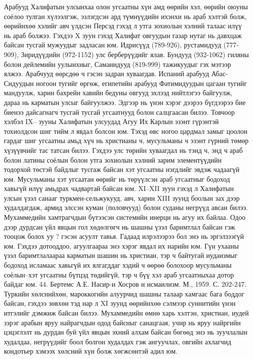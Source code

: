Арабууд Халифатын улсынхаа олон угсаатны хүн амд өөрийн хэл, өөрийн оюуны соёлоо тулган хүлээлгэж, эзлэгдсэн ард түмнүүдийн ихэнхи нь араб хэлтэй болж, өөрийнхөө хэлийг авч үлдсэн Персэд гэхэд л утга зохиолын хэлний талаас илүү нь араб болжээ.
Гэхдээ X зуун гэхэд Халифат овгуудын газар нутаг нь давхцаж байсан тусгай мужуудыг задласан юм. Идрисүүд (789-926), рустамидууд (777-909), Зиридүүдийн (972-1152) улс берберүүдийг ялав. Бундууд (932-1062) гиляны болон дейлемийн уулынхныг, Саманидууд (819-999) тажикуудыг гэх мэтээр ялжээ. Арабчууд өөрсдөө ч гэсэн задран хуваагдав. Испаний арабууд Абас-Сидуудын ногоон тугийг өргөж, египетийн арабууд Фатимидуудын цагаан тугийг мандуулж, харин бахрейн хавийн бедуны овгууд эхлээд нийтлэгээ байгуулж, дараа нь карматын улсыг байгуулжээ. Эдгээр нь үнэн хэрэг дээрээ бүгдээрээ бие биенээ дайсагнагч тусгай тусгай угсаатнууд болон салцгаасан билээ.
Товчоор хэлбэл IX– зууны Халифатын улсуудад Агуу Их Карлын эзэнт гүрэнтэй тохиолдсон шиг тийм л явдал болсон юм. Тэхэд өвс ногоо цардмал замыг цоолон гардаг шиг угсаатны амьд хүч нь христианы ч, мусульманы ч эзэнт гүрний төмөр хүзүүвчийг тас татсан билээ. Гэхдээ улс төрийн хуваагдал нь тэнд ч, энд ч араб болон латины соёлын болон утга зохиолын хэлний зарим элементүүдийн тодорхой төстэй байдлыг тусгаж байсан хэт угсаатны нэгдлийг эвдэж чадаагүй юм. Мусульманы хэт угсаатан өөрийг нь төрүүлсэн араб угсаатныг бодоход хавьгүй илүү амьдрах чадвартай байсан юм. XI–XII зуун гэхэд л Халифатын улсын үзэл санааг туркмен-сельжукууд, авч, харин XIII зуунд боолын зах дээр худалдагдаж, армид элссэн куман (половчууд) болон суданы негрүүд авсан билээ. Мухаммедийн хамтрагчдын бүтээсэн системийн инерци нь агуу их байлаа.
Одоо дээр дурдсан үйл явцын гол хөдөлгөгч нь шашны үзэл баримтлал байсан гэж тооцож болох уу ? гэсэн асуулт тавья. Гадаад илрэлээрээ бол энэ нь эргэлзээгүй юм. Гэхдээ дотооддоо, агуулгаараа энэ хэрэг явдал их нарийн юм. Гүн ухааны үзэл баримтлалаараа карматын шашин нь христиан, тэр ч байтугай иудаизмыг бодоход исламаас хавьгүй их ялгагддаг хэдий ч өөрөө болохоор мусульманы соёлын–хэт угсаатны бүтцэд төдийгүй, тэр ч бүү хэл араб угсаатныхаа дотор байдаг юм. 44. Бертемс А.Е. Насир-и Хосров и исмаилизм. М., 1959. С. 202-247.
Туркийн хөлснийхөн, мароккогийн алуурчид шашны талаар хамгаас бага боддог байсан, гэхдээ зөвхөн тэд нар л XI зуунд өөрийнхөө сэлмээр суннитийн үнэн итгэлийг дэмжиж байсан билээ. Мухаммедийн өмнө харь хэлтэн, христиан, иудей зэрэг арабын яруу найрагчдын одод байсныг санацгаая, учир нь яруу найргийн цэцэглэлт нь дурдан буй үйл явцын эхний алхам байсан бөгөөд энэ нь зуучлалын худалдаа, негрүүдийг боол болгон худалдах гэж ангуучлах, овгийн ахлагчид кондотьер хэмээх хөлсний хүн болж хөгжсөнтэй адил юм.
